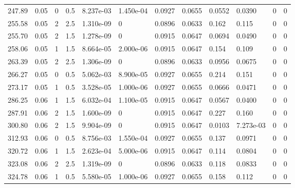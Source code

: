 \documentclass[preview]{standalone}
\begin{document}
{{\begin{tabular}{L{1.2cm}C{1.2cm} C{0.3cm}C{0.5cm} C{1.4cm}C{1.4cm} C{1.4cm}C{1.4cm} C{1.6cm}C{1.6cm} C{1.6cm}C{1.6cm}}
  247.89  &  0.05  & 0     & 0.5 &  8.237e-03  & 1.450e-04  &  0.0927&   0.0655& 0.0552 & 0.0390   &  0 & 0  \\ 
  255.58  &  0.05  & 2     & 2.5 &  1.310e-09  & 0  &  0.0896&   0.0633& 0.162 & 0.115   &  0 & 0  \\ 
  255.70  &  0.05  & 2     & 1.5 &  1.278e-09  & 0  &  0.0915&   0.0647& 0.0694 & 0.0490   &  0 & 0  \\ 
  258.06  &  0.05  & 1     & 1.5 &  8.664e-05  & 2.000e-06  &  0.0915&   0.0647& 0.154 & 0.109   &  0 & 0  \\ 
  263.39  &  0.05  & 2     & 2.5 &  1.306e-09  & 0  &  0.0896&   0.0633& 0.0956 & 0.0675   &  0 & 0  \\ 
  266.27  &  0.05  & 0     & 0.5 &  5.062e-03  & 8.900e-05  &  0.0927&   0.0655& 0.214 & 0.151   &  0 & 0  \\ 
  273.17  &  0.05  & 1     & 0.5 &  3.528e-05  & 1.000e-06  &  0.0927&   0.0655& 0.0666 & 0.0471   &  0 & 0  \\ 
  286.25  &  0.06  & 1     & 1.5 &  6.032e-04  & 1.100e-05  &  0.0915&   0.0647& 0.0567 & 0.0400   &  0 & 0  \\ 
  287.91  &  0.06  & 2     & 1.5 &  1.600e-09  & 0  &  0.0915&   0.0647& 0.227 & 0.160   &  0 & 0  \\ 
  300.80  &  0.06  & 2     & 1.5 &  9.904e-09  & 0  &  0.0915&   0.0647& 0.0103 & 7.273e-03   &  0 & 0  \\ 
  312.93  &  0.06  & 0     & 0.5 &  8.756e-03  & 1.550e-04  &  0.0927&   0.0655& 0.137 & 0.0971   &  0 & 0  \\ 
  320.72  &  0.06  & 1     & 1.5 &  2.623e-04  & 5.000e-06  &  0.0915&   0.0647& 0.114 & 0.0804   &  0 & 0  \\ 
  323.08  &  0.06  & 2     & 2.5 &  1.319e-09  & 0  &  0.0896&   0.0633& 0.118 & 0.0833   &  0 & 0  \\ 
  324.78  &  0.06  & 1     & 0.5 &  5.580e-05  & 1.000e-06  &  0.0927&   0.0655& 0.158 & 0.112   &  0 & 0  \\ 
\hline 
\end{tabular} 

}}
\end{document}
